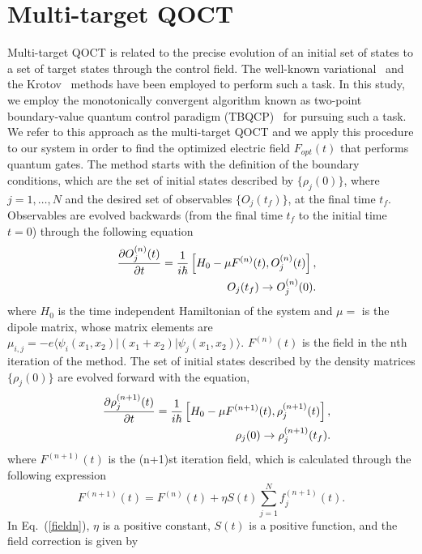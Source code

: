 \documentclass[prb,twocolumn,showpacs,floats]{revtex4}
\begin{document}
\section{Multi-target QOCT}\label{AppendixB}
Multi-target QOCT is related to the precise evolution of an initial set of states to a set of target states through the  control field. The well-known variational~\cite{multitarget} and the Krotov~\cite{Kosloff} methods have been employed to perform such a task. In this study, we employ the monotonically convergent algorithm known as two-point boundary-value quantum control paradigm (TBQCP)~\cite{tbqcp} for pursuing such a task.  We refer to this approach as the multi-target QOCT
 and we apply this procedure to our system in order to find the optimized electric field $F_{opt}(t)$ that performs quantum gates.  
 The method starts with the definition of the boundary conditions, which are the set of initial states described by $\{ \rho_j(0) \}$, where $j=1,\dots,N$ and the desired set of observables $\{ O_j(t_f)\}$, at the final time $t_f$. Observables are evolved backwards (from the final time $t_f$ to the initial time $t=0$) through the following equation 
\begin{eqnarray}\label{oper}
&&\frac{\partial O_j^{(n)}(t)}{\partial t}=\frac{1}{i\text{\ensuremath{\hbar}}}\left[H_{0}-\mu F^{(n)}(t),O_j^{(n)}(t)\right],\nonumber\\ &&O_j(t_f) \rightarrow O^{(n)}_j(0).
\end{eqnarray}
where $H_{0}$ is the time independent Hamiltonian of the system and $\mu=$ is the dipole matrix, whose matrix elements are $\mu_{i,j}=-e\langle\psi_i(x_1,x_2)|\left(x_1+x_2\right)|\psi_j(x_1,x_2)\rangle$.  $F^{(n)}(t)$ is the field in the nth iteration of the method. The set of initial states described by the density matrices $\{ \rho_j(0) \}$ are evolved forward with the equation,
\begin{eqnarray}\label{fwdevol}
&&\frac{\partial \rho_j^{(n+1)}(t)}{\partial t}=\frac{1}{i\text{\ensuremath{\hbar}}}\left[H_{0}-\mu F^{(n+1)}(t),\rho_j^{(n+1)}(t)\right],\nonumber\\ &&\rho_j(0) \rightarrow \rho^{(n+1)}_j(t_f).
\end{eqnarray}
where $F^{(n+1)}(t)$ is the (n+1)st iteration field, which is calculated through the following expression
\begin{equation}
F^{(n+1)}(t)=F^{(n)}(t)+ \eta S(t)\sum_{j=1}^N f^{(n+1)}_{j}(t).\label{fieldn}
\end{equation}
In Eq.~(\ref{fieldn}), $\eta$ is a positive constant, $S(t)$ is a positive function, and the field correction is given by
\end{document}
